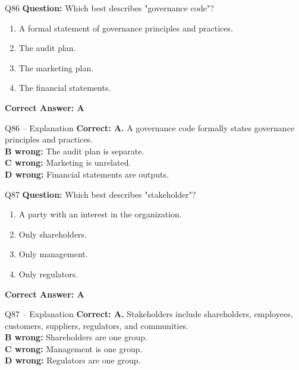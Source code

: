 \documentclass[aspectratio=169,10pt]{beamer}
\begin{document}
	\begin{frame}[t]{Q86}
		\small
		\textbf{Question:} Which best describes "governance code"?
		\begin{enumerate}[label=\Alph*.,itemsep=1pt,topsep=2pt]
			\item A formal statement of governance principles and practices.
			\item The audit plan.
			\item The marketing plan.
			\item The financial statements.
		\end{enumerate}
		\vspace{4pt}
		\textbf{Correct Answer: A}
	\end{frame}
	
	\begin{frame}[t]{Q86 -- Explanation}
		\small
		\textbf{Correct: A.} A governance code formally states governance principles and practices. \\[4pt]
		\textbf{B wrong:} The audit plan is separate. \\[2pt]
		\textbf{C wrong:} Marketing is unrelated. \\[2pt]
		\textbf{D wrong:} Financial statements are outputs.
	\end{frame}
	
	\begin{frame}[t]{Q87}
		\small
		\textbf{Question:} Which best describes "stakeholder"?
		\begin{enumerate}[label=\Alph*.,itemsep=1pt,topsep=2pt]
			\item A party with an interest in the organization.
			\item Only shareholders.
			\item Only management.
			\item Only regulators.
		\end{enumerate}
		\vspace{4pt}
		\textbf{Correct Answer: A}
	\end{frame}
	
	\begin{frame}[t]{Q87 -- Explanation}
		\small
		\textbf{Correct: A.} Stakeholders include shareholders, employees, customers, suppliers, regulators, and communities. \\[4pt]
		\textbf{B wrong:} Shareholders are one group. \\[2pt]
		\textbf{C wrong:} Management is one group. \\[2pt]
		\textbf{D wrong:} Regulators are one group.
	\end{frame}
	
\end{document}
